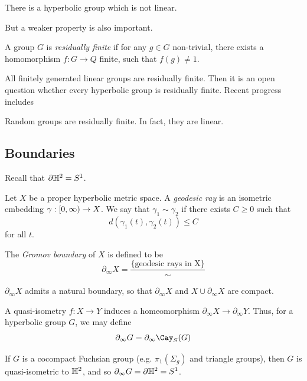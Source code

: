 \documentclass{article}
\begin{document}
\begin{theorem}
    [M. Kapovich] There is a hyperbolic group which is not linear.
\end{theorem}

But a weaker property is also important.

\begin{definition}
    A group \(G\) is \emph{residually finite} if for any \(g \in G\) non-trivial, there exists a homomorphism \(f : G \to Q\) finite, such that \(f(g) \ne 1\).
\end{definition}

All finitely generated linear groups are residually finite. Then it is an open question whether every hyperbolic group is residually finite. Recent progress includes

\begin{theorem}
     Random groups are residually finite. In fact, they are linear.
\end{theorem}

\subsection*{Boundaries}

Recall that \(\partial\mathbb{H}^2 = S^1\).

\begin{definition}
    Let \(X\) be a proper hyperbolic metric space. A \emph{geodesic ray} is an isometric embedding \(\gamma : [0, \infty) \to X\). We say that \(\gamma_1 \sim \gamma_2\) if there exists \(C \ge 0\) such that
    \[d(\gamma_1(t), \gamma_2(t)) \le C\]
    for all \(t\).

    The \emph{Gromov boundary} of \(X\) is defined to be
    \[\partial_\infty X = \frac{\{\text{geodesic rays in X}\}}{\sim}\]
\end{definition}

\begin{remark}
    \(\partial_\infty X\) admits a natural boundary, so that \(\partial_\infty X\) and \(X \cup \partial_\infty X\) are compact.
\end{remark}

A quasi-isometry \(f : X \to Y\) induces a homeomorphism \(\partial_\infty X \to \partial_\infty Y\). Thus, for a hyperbolic group \(G\), we may define
\[\partial_\infty G = \partial_\infty \Cay_S(G)\]

\begin{example}
    If \(G\) is a cocompact Fuchsian group (e.g. \(\pi_1(\Sigma_g)\) and triangle groups), then \(G\) is quasi-isometric to \(\mathbb{H}^2\), and so \(\partial_\infty G = \partial\mathbb{H}^2 = S^1\).
\end{example}
\end{document}
